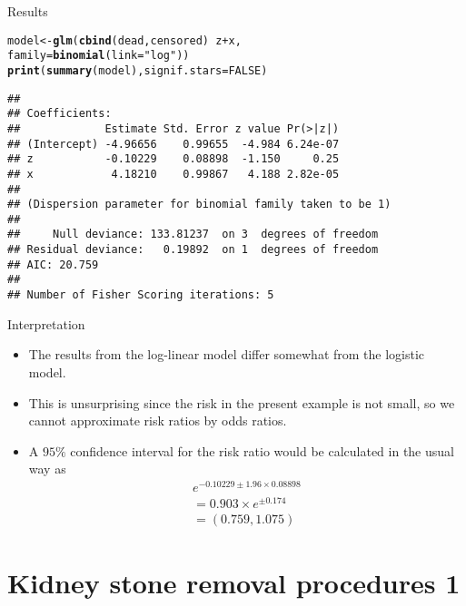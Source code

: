 \documentclass[10pt]{beamer}\usepackage[]{graphicx}\usepackage[]{color}
\makeatletter
\newcommand{\hlnum}[1]{\textcolor[rgb]{0.686,0.059,0.569}{#1}}%
\newcommand{\hlstr}[1]{\textcolor[rgb]{0.192,0.494,0.8}{#1}}%
\newcommand{\hlopt}[1]{\textcolor[rgb]{0,0,0}{#1}}%
\newcommand{\hlstd}[1]{\textcolor[rgb]{0.345,0.345,0.345}{#1}}%
\newcommand{\hlkwb}[1]{\textcolor[rgb]{0.69,0.353,0.396}{#1}}%
\newcommand{\hlkwc}[1]{\textcolor[rgb]{0.333,0.667,0.333}{#1}}%
\newcommand{\hlkwd}[1]{\textcolor[rgb]{0.737,0.353,0.396}{\textbf{#1}}}%
\newenvironment{kframe}{%
 \def\at@end@of@kframe{}%
 \ifinner\ifhmode%
  \def\at@end@of@kframe{\end{minipage}}%
  \begin{minipage}{\columnwidth}%
 \fi\fi%
 \def\FrameCommand##1{\hskip\@totalleftmargin \hskip-\fboxsep
 \colorbox{shadecolor}{##1}\hskip-\fboxsep
     \hskip-\linewidth \hskip-\@totalleftmargin \hskip\columnwidth}%
 \MakeFramed {\advance\hsize-\width
   \@totalleftmargin\z@ \linewidth\hsize
   \@setminipage}}%
 {\par\unskip\endMakeFramed%
 \at@end@of@kframe}
\newenvironment{knitrout}{}{} %
\makeatother
\begin{document}
\begin{frame}[fragile]{Results}
\begin{knitrout}
\color{fgcolor}\begin{kframe}
\begin{alltt}
\hlstd{model} \hlkwb{<-} \hlkwd{glm}\hlstd{(}\hlkwd{cbind}\hlstd{(dead,censored)} \hlopt{~} \hlstd{z} \hlopt{+} \hlstd{x,}
             \hlkwc{family}\hlstd{=}\hlkwd{binomial}\hlstd{(}\hlkwc{link}\hlstd{=}\hlstr{"log"}\hlstd{))}
\hlkwd{print}\hlstd{(}\hlkwd{summary}\hlstd{(model),} \hlkwc{signif.stars} \hlstd{=} \hlnum{FALSE}\hlstd{)}
\end{alltt}
\begin{verbatim}
## 
## Coefficients:
##             Estimate Std. Error z value Pr(>|z|)
## (Intercept) -4.96656    0.99655  -4.984 6.24e-07
## z           -0.10229    0.08898  -1.150     0.25
## x            4.18210    0.99867   4.188 2.82e-05
## 
## (Dispersion parameter for binomial family taken to be 1)
## 
##     Null deviance: 133.81237  on 3  degrees of freedom
## Residual deviance:   0.19892  on 1  degrees of freedom
## AIC: 20.759
## 
## Number of Fisher Scoring iterations: 5
\end{verbatim}
\end{kframe}
\end{knitrout}
\end{frame}



\begin{frame}[fragile]{Interpretation}
	\begin{itemize}
		\item The results from the log-linear model differ somewhat from the logistic model.
		\item This is unsurprising since the risk in the present example is not small, so we cannot approximate risk ratios by odds ratios.
		\item A $95 \%$ confidence interval for the risk ratio would be
		calculated in the usual way as
		$$
		\begin{array}{l}
		e^{-0.10229 \pm 1.96 \times 0.08898} \\
		=0.903 \times e^{\pm 0.174} \\
		=(0.759,1.075)
		\end{array}
		$$
	\end{itemize}
\end{frame}




\section{Kidney stone removal procedures 1}
\end{document}
